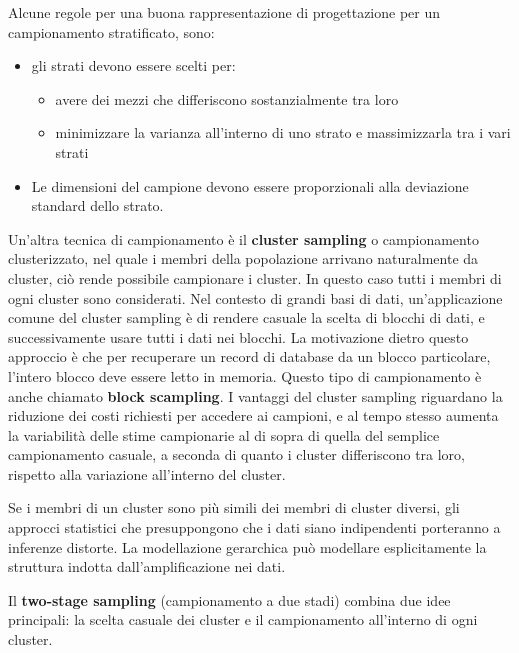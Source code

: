 \documentclass[a4paper]{extarticle}
\begin{document}
Alcune regole per una buona rappresentazione di progettazione per un campionamento stratificato, sono:
\begin{itemize}
\item gli strati devono essere scelti per:
	\begin{itemize}
	\item avere dei mezzi che differiscono sostanzialmente tra loro
	\item minimizzare la varianza all'interno di uno strato e massimizzarla tra i vari strati
	\end{itemize}
\item Le dimensioni del campione devono essere proporzionali alla deviazione standard dello strato.
\end{itemize}

Un'altra tecnica di campionamento è il \textbf{cluster sampling} o campionamento clusterizzato, nel quale i membri della popolazione arrivano naturalmente da cluster, ciò rende possibile campionare i cluster. In questo caso tutti i membri di ogni cluster sono considerati. Nel contesto di grandi basi di dati, un'applicazione comune del cluster sampling è di rendere casuale la scelta di blocchi di dati, e successivamente usare tutti i dati nei blocchi. La motivazione dietro questo approccio è che per recuperare un record di database da un blocco particolare, l'intero blocco deve essere letto in memoria. Questo tipo di campionamento è anche chiamato \textbf{block scampling}. I vantaggi del cluster sampling riguardano la riduzione dei costi richiesti per accedere ai campioni, e al tempo stesso aumenta la variabilità delle stime campionarie al di sopra di quella del semplice campionamento casuale, a seconda di quanto i cluster differiscono tra loro, rispetto alla variazione all'interno del cluster.

Se i membri di un cluster sono più simili dei membri di cluster diversi, gli approcci statistici che presuppongono che i dati siano indipendenti porteranno a inferenze distorte. La modellazione gerarchica può modellare esplicitamente la struttura indotta dall'amplificazione nei dati.

Il \textbf{two-stage sampling} (campionamento a due stadi) combina due idee principali: la scelta casuale dei cluster e il campionamento all'interno di ogni cluster. 
\end{document}
